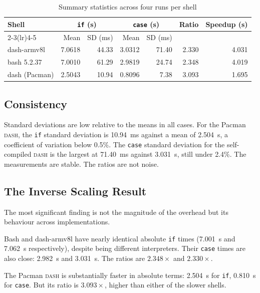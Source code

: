 \documentclass[11pt,a4paper]{article}
\begin{document}
\begin{table}[H]
\centering
\caption{Summary statistics across four runs per shell}
\label{tab:summary}
\small
\begin{tabular}{@{}lrrrrrr@{}}
\toprule
Shell &
  \multicolumn{2}{c}{\texttt{if} (s)} &
  \multicolumn{2}{c}{\texttt{case} (s)} &
  Ratio &
  Speedup (s) \\
\cmidrule(lr){2-3}\cmidrule(lr){4-5}
& Mean & SD (ms) & Mean & SD (ms) & & \\
\midrule
dash-armv8l   & 7.0618 & 44.33 & 3.0312 & 71.40 & 2.330 & 4.031 \\
bash 5.2.37   & 7.0010 & 61.29 & 2.9819 & 24.74 & 2.348 & 4.019 \\
dash (Pacman) & 2.5043 & 10.94 & 0.8096 &  7.38 & 3.093 & 1.695 \\
\bottomrule
\end{tabular}
\end{table}

\subsection{Consistency}

Standard deviations are low relative to the means in all cases.
For the Pacman \textsc{dash}, the \texttt{if} standard deviation is
\SI{10.94}{\milli\second} against a mean of \SI{2.504}{\second},
a coefficient of variation below 0.5\%.
The \texttt{case} standard deviation for the self-compiled
\textsc{dash} is the largest at \SI{71.40}{\milli\second} against
\SI{3.031}{\second}, still under 2.4\%.
The measurements are stable.
The ratios are not noise.

\subsection{The Inverse Scaling Result}

The most significant finding is not the magnitude of the overhead
but its behaviour across implementations.

Bash and dash-armv8l have nearly identical absolute \texttt{if}
times (\SI{7.001}{\second} and \SI{7.062}{\second} respectively),
despite being different interpreters.
Their \texttt{case} times are also close: \SI{2.982}{\second} and
\SI{3.031}{\second}.
The ratios are $2.348\times$ and $2.330\times$.

The Pacman \textsc{dash} is substantially faster in absolute terms:
\SI{2.504}{\second} for \texttt{if}, \SI{0.810}{\second} for
\texttt{case}.
But its ratio is $3.093\times$, higher than either of the slower
shells.
\end{document}
